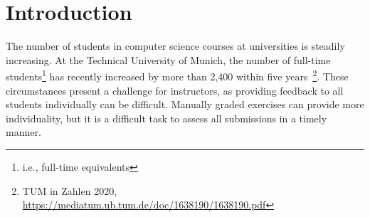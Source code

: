 
\def\proposal{Proposal for}

\usepackage[nolist]{acronym}
\usepackage{csquotes}

\usepackage{titlesec}


\setlength{\evensidemargin}{22pt}
\setlength{\oddsidemargin}{22pt}



\lstset{showspaces=false, numbers=left, frame=single, basicstyle=\small}




\fancyhead{}
\pagestyle{fancy}
\fancyhead[LE]{\slshape \leftmark}
\fancyhead[RO]{\slshape \rightmark}
\headheight=15pt


\section{Introduction}


The number of students in computer science courses at universities is steadily increasing. At the Technical University of Munich, the number of full-time students\footnote{i.e., full-time equivalents} has recently increased by more than 2,400 within five years~\footnote{TUM in Zahlen 2020, \url{https://mediatum.ub.tum.de/doc/1638190/1638190.pdf}}.
These circumstances present a challenge for instructors, as providing feedback to all students individually can be difficult. Manually graded exercises can provide more individuality, but it is a difficult task to assess all submissions in a timely manner.

